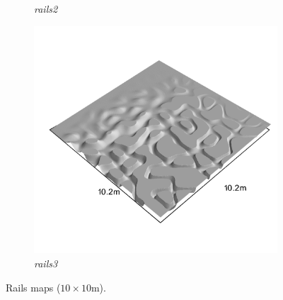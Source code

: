 \documentclass[../document.tex]{subfiles}
\begin{document}
\begin{figure}[htbp]
\begin{subfigure}[b]{0.32\linewidth}
            \caption{\emph{rails2}}
            \end{subfigure}    
          \begin{subfigure}[b]{0.32\textwidth}
            \includegraphics[width=\textwidth]{../img/hm3d_borders/rails3.png}
            \caption{\emph{rails3}}
        \end{subfigure}    
    \caption{Rails maps ($10\times10$m).}
\end{figure}
\end{document}
